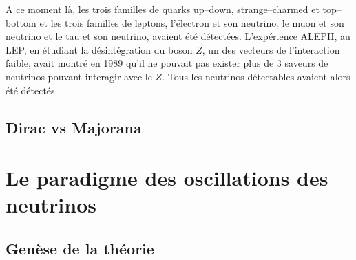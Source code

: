 	        A ce moment là, les trois familles de quarks up--down, strange--charmed et top--bottom et les trois familles de leptons, l'électron et son neutrino, le muon et son neutrino et le tau et son neutrino, avaient été détectées. L'expérience ALEPH, au LEP, en étudiant la désintégration du boson $Z$, un des vecteurs de l'interaction faible, avait montré en 1989 qu'il ne pouvait pas exister plus de 3 saveurs de neutrinos pouvant interagir avec le $Z$\cite{DeCamp1989}. Tous les neutrinos détectables avaient alors été détectés.
        
        \subsection{Dirac vs Majorana}\label{sec::dirac_majorana}
        
	        
    
    \section{Le paradigme des oscillations des neutrinos}
    
        \subsection{Genèse de la théorie}
        
